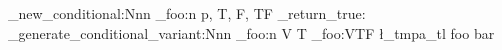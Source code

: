 \prg_new_conditional:Nnn
  \module_foo:n
  { p, T, F, TF }
  { \prg_return_true: }
\prg_generate_conditional_variant:Nnn
  \module_foo:n
  { V }
  { T }
\module_foo:VTF  %
  \l_tmpa_tl
  { foo }
  { bar }
